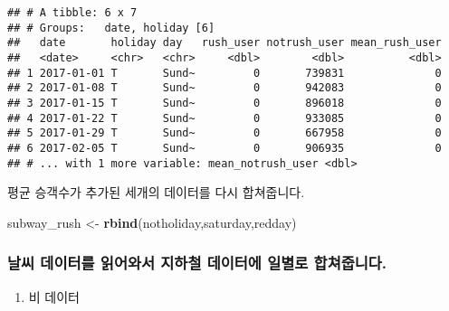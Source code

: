 \documentclass[]{article}
\newenvironment{Shaded}{\begin{snugshade}}{\end{snugshade}}
\newcommand{\KeywordTok}[1]{\textcolor[rgb]{0.13,0.29,0.53}{\textbf{#1}}}
\newcommand{\DataTypeTok}[1]{\textcolor[rgb]{0.13,0.29,0.53}{#1}}
\newcommand{\DecValTok}[1]{\textcolor[rgb]{0.00,0.00,0.81}{#1}}
\newcommand{\StringTok}[1]{\textcolor[rgb]{0.31,0.60,0.02}{#1}}
\newcommand{\CommentTok}[1]{\textcolor[rgb]{0.56,0.35,0.01}{\textit{#1}}}
\newcommand{\OtherTok}[1]{\textcolor[rgb]{0.56,0.35,0.01}{#1}}
\newcommand{\OperatorTok}[1]{\textcolor[rgb]{0.81,0.36,0.00}{\textbf{#1}}}
\newcommand{\NormalTok}[1]{#1}
\providecommand{\tightlist}{%
  \setlength{\itemsep}{0pt}\setlength{\parskip}{0pt}}
\begin{document}
\begin{verbatim}
## # A tibble: 6 x 7
## # Groups:   date, holiday [6]
##   date       holiday day   rush_user notrush_user mean_rush_user
##   <date>     <chr>   <chr>     <dbl>        <dbl>          <dbl>
## 1 2017-01-01 T       Sund~         0       739831              0
## 2 2017-01-08 T       Sund~         0       942083              0
## 3 2017-01-15 T       Sund~         0       896018              0
## 4 2017-01-22 T       Sund~         0       933085              0
## 5 2017-01-29 T       Sund~         0       667958              0
## 6 2017-02-05 T       Sund~         0       906935              0
## # ... with 1 more variable: mean_notrush_user <dbl>
\end{verbatim}

평균 승객수가 추가된 세개의 데이터를 다시 합쳐줍니다.

\begin{Shaded}
\begin{Highlighting}[]
\NormalTok{subway_rush <-}\StringTok{ }\KeywordTok{rbind}\NormalTok{(notholiday,saturday,redday)}
\end{Highlighting}
\end{Shaded}

\subsubsection{날씨 데이터를 읽어와서 지하철 데이터에 일별로
합쳐줍니다.}\label{------.}

\begin{enumerate}
\def\labelenumi{\arabic{enumi}.}
\tightlist
\item
  비 데이터
\end{enumerate}

\begin{Shaded}
\end{Shaded}
\end{document}
